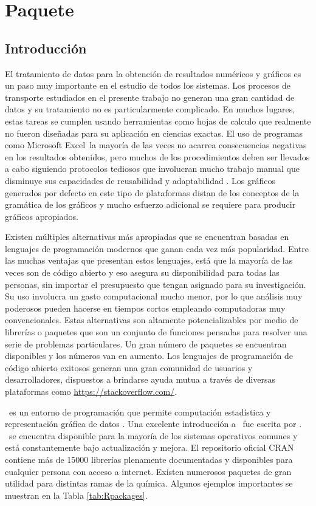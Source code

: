 \chapter{Paquete \trm}\label{sec:transmem66i}

\section{Introducción}
El tratamiento de datos para la obtención de resultados numéricos y gráficos es un paso muy importante en el estudio de todos los sistemas. Los procesos de transporte estudiados en el presente trabajo no generan una gran cantidad de datos y su tratamiento no es particularmente complicado. En muchos lugares, estas tareas se cumplen usando herramientas como hojas de calculo que realmente no fueron diseñadas para su aplicación en ciencias exactas. El uso de programas como Microsoft Excel\textregistered\ la mayoría de las veces no acarrea consecuencias negativas en los resultados obtenidos, pero muchos de los procedimientos deben ser llevados a cabo siguiendo protocolos tediosos que involucran mucho trabajo {manual} que disminuye sus capacidades de reusabilidad y adaptabilidad \citep{Incerti2019}. Los gráficos generados por defecto en este tipo de plataformas distan de los conceptos de la gramática de los gráficos \citep{Wilkinson2005} y mucho esfuerzo adicional se requiere para producir gráficos apropiados. 

Existen múltiples alternativas más apropiadas que se encuentran basadas en lenguajes de programación modernos que ganan cada vez más popularidad. Entre las muchas ventajas que presentan estos lenguajes, está que la mayoría de las veces son de código abierto y eso asegura su disponibilidad para todas las personas, sin importar el presupuesto que tengan asignado para su investigación. Su uso involucra un gasto computacional mucho menor, por lo que análisis muy poderosos pueden hacerse en tiempos cortos empleando computadoras muy convencionales. Estas alternativas son altamente potencializables por medio de librerías o {paquetes} que son un conjunto de funciones pensadas para resolver una serie de problemas particulares. Un gran número de paquetes se encuentran disponibles y los números van en aumento. Los lenguajes de programación de código abierto exitosos generan una gran comunidad de usuarios y desarrolladores, dispuestos a brindarse ayuda mutua a través de diversas plataformas como \url{https://stackoverflow.com/}.


\R\ es un entorno de programación que permite computación estadística y representación gráfica de datos \citep{R}. Una excelente introducción a \R\ fue escrita por \citet{Venables2004}. \R\ se encuentra disponible para la mayoría de los sistemas operativos comunes y está constantemente bajo actualización y mejora. El repositorio oficial \ac{CRAN} contiene más de 15000 librerías plenamente documentadas y disponibles para cualquier persona con acceso a internet. Existen numerosos paquetes de gran utilidad para distintas ramas de la química. Algunos ejemplos importantes se muestran en la Tabla \ref{tab:Rpackages}.


